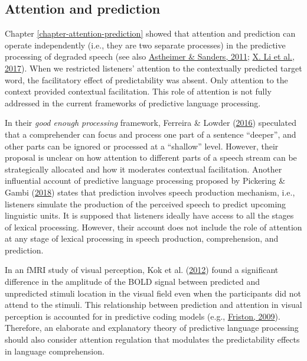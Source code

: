 \documentclass[a4paper, nobind]{templates/ociamthesis}
\begin{document}
\hypertarget{attention-and-prediction}{%
\subsection{Attention and prediction}\label{attention-and-prediction}}

Chapter \ref{chapter-attention-prediction} showed that attention and prediction can operate independently (i.e., they are two separate processes) in the predictive processing of degraded speech (see also \protect\hyperlink{ref-Astheimer2011}{Astheimer \& Sanders, 2011}; \protect\hyperlink{ref-Li2017}{X. Li et al., 2017}).
When we restricted listeners' attention to the contextually predicted target word, the facilitatory effect of predictability was absent.
Only attention to the context provided contextual facilitation.
This role of attention is not fully addressed in the current frameworks of predictive language processing.

In their \emph{good enough processing} framework, Ferreira \& Lowder (\protect\hyperlink{ref-Ferreira2016}{2016}) speculated that a comprehender can focus and process one part of a sentence ``deeper'',
and other parts can be ignored or processed at a ``shallow'' level.
However, their proposal is unclear on how attention to different parts of a speech stream can be strategically allocated
and how it moderates contextual facilitation.
Another influential account of predictive language processing proposed by Pickering \& Gambi (\protect\hyperlink{ref-Pickering2018}{2018}) states that prediction involves speech production mechanism,
i.e., listeners simulate the production of the perceived speech to predict upcoming linguistic units.
It is supposed that listeners ideally have access to all the stages of lexical processing.
However, their account does not include the role of attention at any stage of lexical processing in speech production, comprehension, and prediction.

In an fMRI study of visual perception, Kok et al. (\protect\hyperlink{ref-Kok2012}{2012}) found a significant difference in the amplitude of the BOLD signal between predicted and unpredicted stimuli location in the visual field even when the participants did not attend to the stimuli.
This relationship between prediction and attention in visual perception is accounted for in predictive coding models (e.g., \protect\hyperlink{ref-Friston2009}{Friston, 2009}).
Therefore, an elaborate and explanatory theory of predictive language processing should also consider attention regulation that modulates the predictability effects in language comprehension.
\end{document}
